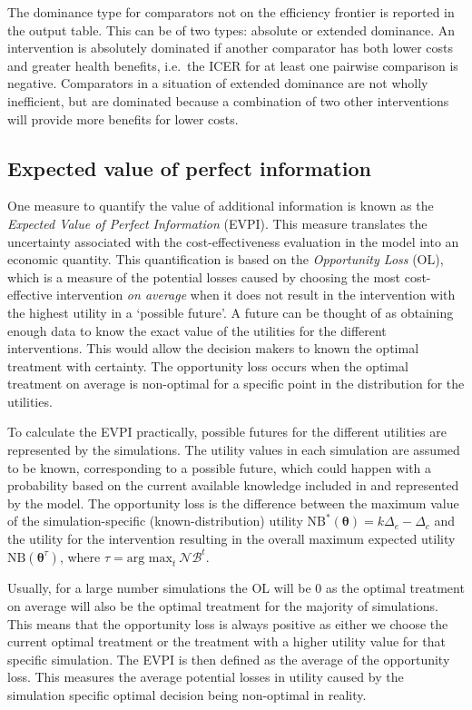 \documentclass[]{article}
\begin{document}
The dominance type for comparators not on the efficiency frontier is
reported in the output table. This can be of two types: absolute or
extended dominance. An intervention is absolutely dominated if another
comparator has both lower costs and greater health benefits, i.e.~the
ICER for at least one pairwise comparison is negative. Comparators in a
situation of extended dominance are not wholly inefficient, but are
dominated because a combination of two other interventions will provide
more benefits for lower costs.

\hypertarget{expected-value-of-perfect-information}{%
\subsection{Expected value of perfect
information}\label{expected-value-of-perfect-information}}

One measure to quantify the value of additional information is known as
the \emph{Expected Value of Perfect Information} (EVPI). This measure
translates the uncertainty associated with the cost-effectiveness
evaluation in the model into an economic quantity. This quantification
is based on the \emph{Opportunity Loss} (OL), which is a measure of the
potential losses caused by choosing the most cost-effective intervention
\emph{on average} when it does not result in the intervention with the
highest utility in a `possible future'. A future can be thought of as
obtaining enough data to know the exact value of the utilities for the
different interventions. This would allow the decision makers to known
the optimal treatment with certainty. The opportunity loss occurs when
the optimal treatment on average is non-optimal for a specific point in
the distribution for the utilities.

To calculate the EVPI practically, possible futures for the different
utilities are represented by the simulations. The utility values in each
simulation are assumed to be known, corresponding to a possible future,
which could happen with a probability based on the current available
knowledge included in and represented by the model. The opportunity loss
is the difference between the maximum value of the simulation-specific
(known-distribution) utility
\(\mbox{NB}^*(\bm\theta)=k\Delta_e-\Delta_c\) and the utility for the
intervention resulting in the overall maximum expected utility
\(\mbox{NB}(\bm\theta^\tau)\), where
\(\tau=\text{arg max}_t ~\mathcal{NB}^t\).

Usually, for a large number simulations the OL will be 0 as the optimal
treatment on average will also be the optimal treatment for the majority
of simulations. This means that the opportunity loss is always positive
as either we choose the current optimal treatment or the treatment with
a higher utility value for that specific simulation. The EVPI is then
defined as the average of the opportunity loss. This measures the
average potential losses in utility caused by the simulation specific
optimal decision being non-optimal in reality.
\end{document}
